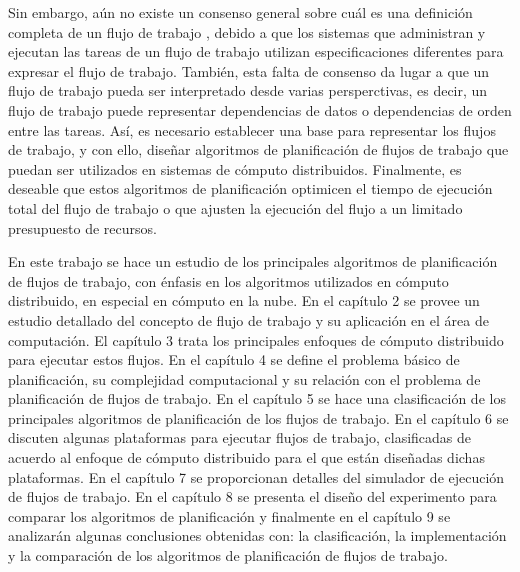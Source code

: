 Sin embargo, aún no existe un consenso general sobre cuál es una definición completa de un flujo de trabajo \cite{van2003workflow}, debido a que los sistemas que administran y ejecutan las tareas de un flujo de trabajo utilizan especificaciones diferentes para expresar el flujo de trabajo. También, esta falta de consenso da lugar a que un flujo de trabajo pueda ser interpretado desde varias persperctivas, es decir, un flujo de trabajo puede representar dependencias de datos o dependencias de orden entre las tareas. Así, es necesario establecer una base para representar los flujos de trabajo, y con ello, diseñar algoritmos de planificación de flujos de trabajo que puedan ser utilizados en sistemas de cómputo distribuidos. Finalmente, es deseable que estos algoritmos de planificación optimicen el tiempo de ejecución total del flujo de trabajo o que ajusten la ejecución del flujo a un limitado presupuesto de recursos.




En este trabajo se hace un estudio de los principales algoritmos de planificación de flujos de trabajo, con énfasis en los algoritmos utilizados en cómputo distribuido, en especial en cómputo en la nube. En el capítulo 2 se provee un estudio detallado del concepto de flujo de trabajo y su aplicación en el área de computación. El capítulo 3 trata los principales enfoques de cómputo distribuido para ejecutar estos flujos. En el capítulo 4 se define el problema básico de planificación, su complejidad computacional y su relación con el problema de planificación de flujos de trabajo. En el capítulo 5 se hace una clasificación de los principales algoritmos de planificación de los flujos de trabajo. En el capítulo 6 se discuten	algunas plataformas para ejecutar flujos de trabajo, clasificadas de acuerdo al enfoque de cómputo distribuido para el que están diseñadas dichas plataformas. En el capítulo 7 se proporcionan detalles del simulador de ejecución de flujos de trabajo. En el capítulo 8 se presenta el diseño del experimento para comparar los algoritmos de planificación y finalmente en el capítulo 9 se analizarán algunas conclusiones obtenidas con: la clasificación, la implementación y la comparación de los algoritmos de planificación de flujos de trabajo.

